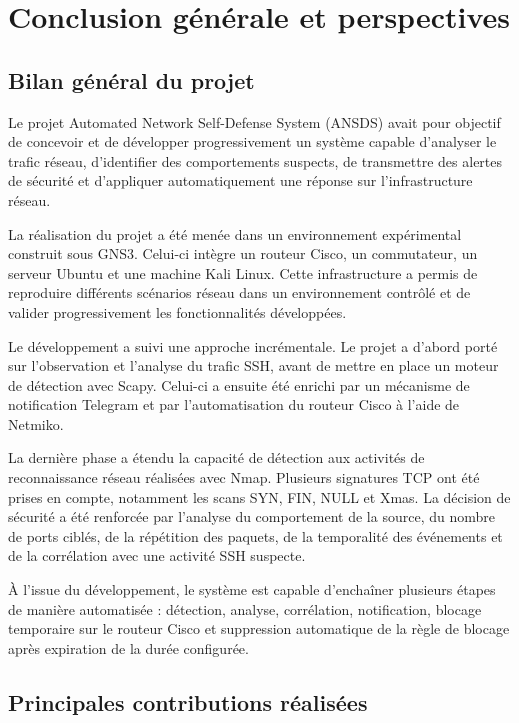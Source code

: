 \chapter{Conclusion générale et perspectives}

\section{Bilan général du projet}

Le projet Automated Network Self-Defense System (ANSDS) avait pour objectif de concevoir et de développer progressivement un système capable d'analyser le trafic réseau, d'identifier des comportements suspects, de transmettre des alertes de sécurité et d'appliquer automatiquement une réponse sur l'infrastructure réseau.

La réalisation du projet a été menée dans un environnement expérimental construit sous GNS3. Celui-ci intègre un routeur Cisco, un commutateur, un serveur Ubuntu et une machine Kali Linux. Cette infrastructure a permis de reproduire différents scénarios réseau dans un environnement contrôlé et de valider progressivement les fonctionnalités développées.

Le développement a suivi une approche incrémentale. Le projet a d'abord porté sur l'observation et l'analyse du trafic SSH, avant de mettre en place un moteur de détection avec Scapy. Celui-ci a ensuite été enrichi par un mécanisme de notification Telegram et par l'automatisation du routeur Cisco à l'aide de Netmiko.

La dernière phase a étendu la capacité de détection aux activités de reconnaissance réseau réalisées avec Nmap. Plusieurs signatures TCP ont été prises en compte, notamment les scans SYN, FIN, NULL et Xmas. La décision de sécurité a été renforcée par l'analyse du comportement de la source, du nombre de ports ciblés, de la répétition des paquets, de la temporalité des événements et de la corrélation avec une activité SSH suspecte.

À l'issue du développement, le système est capable d'enchaîner plusieurs étapes de manière automatisée : détection, analyse, corrélation, notification, blocage temporaire sur le routeur Cisco et suppression automatique de la règle de blocage après expiration de la durée configurée.


\section{Principales contributions réalisées}


